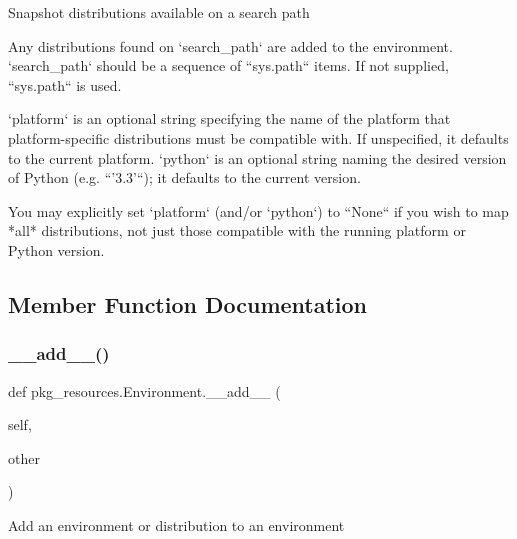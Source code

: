 \begin{DoxyVerb}Snapshot distributions available on a search path

Any distributions found on `search_path` are added to the environment.
`search_path` should be a sequence of ``sys.path`` items.  If not
supplied, ``sys.path`` is used.

`platform` is an optional string specifying the name of the platform
that platform-specific distributions must be compatible with.  If
unspecified, it defaults to the current platform.  `python` is an
optional string naming the desired version of Python (e.g. ``'3.3'``);
it defaults to the current version.

You may explicitly set `platform` (and/or `python`) to ``None`` if you
wish to map *all* distributions, not just those compatible with the
running platform or Python version.
\end{DoxyVerb}
 

\subsection{Member Function Documentation}
\mbox{\label{classpkg__resources_1_1_environment_a8f9750420dd62e8b71b0b2f06f424c57}} 
\subsubsection{\texorpdfstring{\+\_\+\+\_\+add\+\_\+\+\_\+()}{\_\_add\_\_()}}
{\footnotesize\ttfamily def pkg\+\_\+resources.\+Environment.\+\_\+\+\_\+add\+\_\+\+\_\+ (\begin{DoxyParamCaption}\item[{}]{self,  }\item[{}]{other }\end{DoxyParamCaption})}

\begin{DoxyVerb}Add an environment or distribution to an environment\end{DoxyVerb}
 \mbox{\label{classpkg__resources_1_1_environment_af401af1f867613b8f268ab93a1275aff}} 
